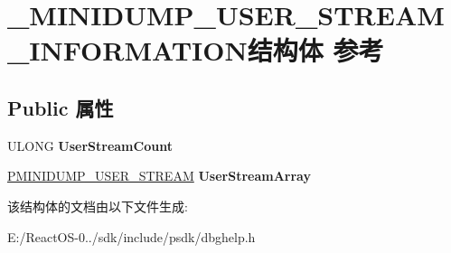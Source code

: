 \hypertarget{struct___m_i_n_i_d_u_m_p___u_s_e_r___s_t_r_e_a_m___i_n_f_o_r_m_a_t_i_o_n}{}\section{\+\_\+\+M\+I\+N\+I\+D\+U\+M\+P\+\_\+\+U\+S\+E\+R\+\_\+\+S\+T\+R\+E\+A\+M\+\_\+\+I\+N\+F\+O\+R\+M\+A\+T\+I\+O\+N结构体 参考}
\label{struct___m_i_n_i_d_u_m_p___u_s_e_r___s_t_r_e_a_m___i_n_f_o_r_m_a_t_i_o_n}
\subsection*{Public 属性}
\begin{DoxyCompactItemize}
\item 
\mbox{\label{struct___m_i_n_i_d_u_m_p___u_s_e_r___s_t_r_e_a_m___i_n_f_o_r_m_a_t_i_o_n_af16438d1fb1f9ef90200cfd423229388}} 
U\+L\+O\+NG {\bfseries User\+Stream\+Count}
\item 
\mbox{\label{struct___m_i_n_i_d_u_m_p___u_s_e_r___s_t_r_e_a_m___i_n_f_o_r_m_a_t_i_o_n_a7a1fa461dbd3ec344fbc7d657709a9f6}} 
\hyperlink{struct___m_i_n_i_d_u_m_p___u_s_e_r___s_t_r_e_a_m}{P\+M\+I\+N\+I\+D\+U\+M\+P\+\_\+\+U\+S\+E\+R\+\_\+\+S\+T\+R\+E\+AM} {\bfseries User\+Stream\+Array}
\end{DoxyCompactItemize}


该结构体的文档由以下文件生成\+:\begin{DoxyCompactItemize}
\item 
E\+:/\+React\+O\+S-\/0../sdk/include/psdk/dbghelp.\+h\end{DoxyCompactItemize}
